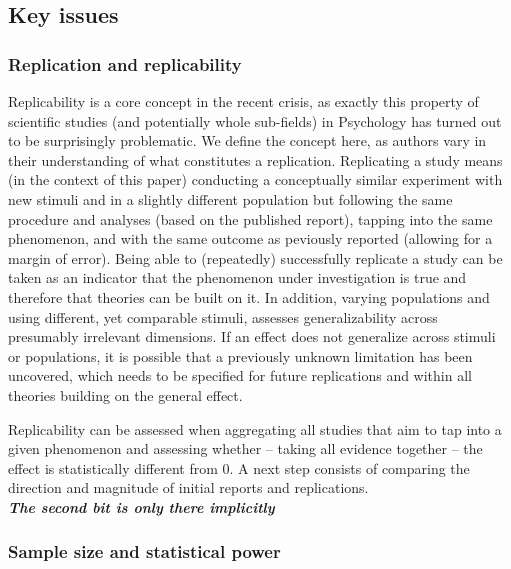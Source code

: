 \documentclass[english,floatsintext,man]{apa6}
\newcounter{author}
\begin{document}
\subsection{Key issues}\label{key-issues}

\subsubsection{Replication and
replicability}\label{replication-and-replicability}

Replicability is a core concept in the recent crisis, as exactly this
property of scientific studies (and potentially whole sub-fields) in
Psychology has turned out to be surprisingly problematic. We define the
concept here, as authors vary in their understanding of what constitutes
a replication. Replicating a study means (in the context of this paper)
conducting a conceptually similar experiment with new stimuli and in a
slightly different population but following the same procedure and
analyses (based on the published report), tapping into the same
phenomenon, and with the same outcome as peviously reported (allowing
for a margin of error). Being able to (repeatedly) successfully
replicate a study can be taken as an indicator that the phenomenon under
investigation is true and therefore that theories can be built on it. In
addition, varying populations and using different, yet comparable
stimuli, assesses generalizability across presumably irrelevant
dimensions. If an effect does not generalize across stimuli or
populations, it is possible that a previously unknown limitation has
been uncovered, which needs to be specified for future replications and
within all theories building on the general effect.

Replicability can be assessed when aggregating all studies that aim to
tap into a given phenomenon and assessing whether -- taking all evidence
together -- the effect is statistically different from 0. A next step
consists of comparing the direction and magnitude of initial reports and
replications.\\\textbf{\emph{The second bit is only there implicitly}}

\subsubsection{Sample size and statistical
power}\label{sample-size-and-statistical-power}
\end{document}
